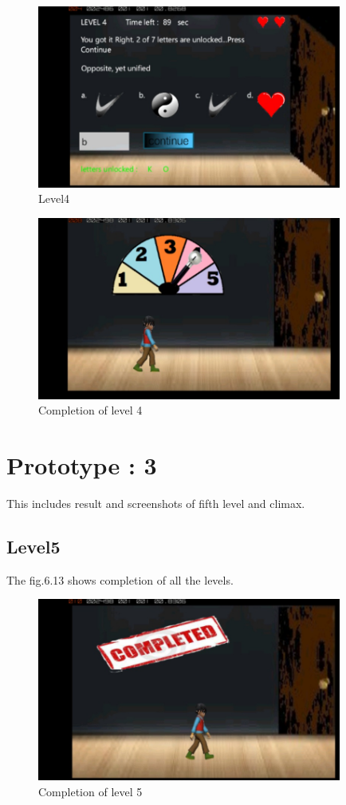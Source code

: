 \begin{figure}[htbp]
	\centering
	\includegraphics[width=10cm,height=6cm]{11.jpg}
	\caption{Level4}
\end{figure}
\begin{figure}[htbp]
	\centering
	\includegraphics[width=10cm,height=6cm]{12.jpg}
	\caption{Completion of level 4}
\end{figure}


\section{Prototype : 3}
\hspace{1cm} This includes result and screenshots of fifth level and climax.

\subsection{Level5}
\hspace{1cm}The fig.6.13 shows completion of all the levels. 
\begin{figure}[htbp]
	\centering
	\includegraphics[width=10cm,height=6cm]{13.jpg}
	\caption{Completion of level 5}
\end{figure}
